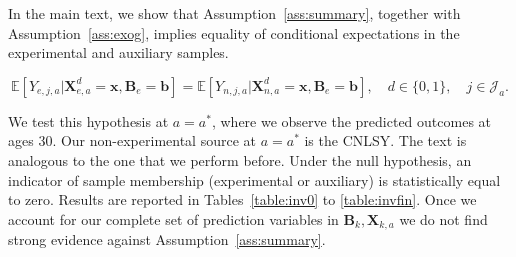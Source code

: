 \noindent In the main text, we show that Assumption~\ref{ass:summary}, together with Assumption~\ref{ass:exog}, implies equality of conditional expectations in the experimental and auxiliary samples.

\begin{equation}\label{eq:withbetimplication}
\mathbb{E} \left[ Y_{e,j,a} | \bm{X}^d_{e,a} = \bm{x}, \bm{B}_e = \bm{b} \right] = \mathbb{E} \left[ Y_{n,j,a} | \bm{X}^d_{n,a} = \bm{x}, \bm{B}_e = \bm{b} \right], \quad d \in \{0,1\}, \quad j \in \mathcal{J}_a.
\end{equation}

\noindent We test this hypothesis at $a = a^*$, where we observe the predicted outcomes at ages 30. Our non-experimental source at $a = a^*$ is the CNLSY. The text is analogous to the one that we perform before. Under the null hypothesis, an indicator of sample membership (experimental or auxiliary) is statistically equal to zero. Results are reported in Tables~\ref{table:inv0} to \ref{table:invfin}. Once we account for our complete set of prediction variables in $\bm{B}_k, \bm{X}_{k,a}$ we do not find strong evidence against Assumption~\ref{ass:summary}.

